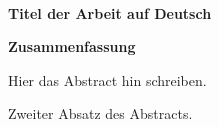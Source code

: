 
\begin{center}
  \HRule\\[0.4cm]
  \Large\bfseries
  Titel der Arbeit auf Deutsch
  \HRule\\[1.5cm]
\end{center}

\begin{center}
  \bfseries
  \large
  Zusammenfassung
\end{center}

\begin{otherlanguage}{ngerman}
\noindent
Hier das Abstract hin schreiben.
\blindtext

Zweiter Absatz des Abstracts.
\blindtext

\end{otherlanguage}

\cleardoublepage
